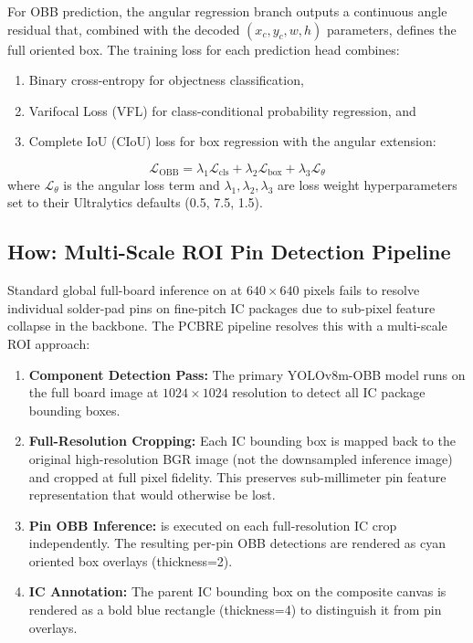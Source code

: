 \documentclass[12pt,a4paper]{report}
\begin{document}
For OBB prediction, the angular regression branch outputs a continuous angle residual that, combined with the decoded $(x_c, y_c, w, h)$ parameters, defines the full oriented box. The training loss for each prediction head combines:
\begin{enumerate}
  \item Binary cross-entropy for objectness classification,
  \item Varifocal Loss (VFL) for class-conditional probability regression, and
  \item Complete IoU (CIoU) loss for box regression with the angular extension:
\end{enumerate}
\begin{equation}
\label{eq:loss}
\mathcal{L}_{\text{OBB}} = \lambda_1 \mathcal{L}_{\text{cls}} + \lambda_2 \mathcal{L}_{\text{box}} + \lambda_3 \mathcal{L}_{\theta}
\end{equation}
where $\mathcal{L}_{\theta}$ is the angular loss term and $\lambda_1, \lambda_2, \lambda_3$ are loss weight hyperparameters set to their Ultralytics defaults (0.5, 7.5, 1.5).

\subsection{How: Multi-Scale ROI Pin Detection Pipeline}
\label{subsec:pin_pipeline}

Standard global full-board inference on  at $640 \times 640$ pixels fails to resolve individual solder-pad pins on fine-pitch IC packages due to sub-pixel feature collapse in the backbone. The PCBRE pipeline resolves this with a multi-scale ROI approach:

\begin{enumerate}
  \item \textbf{Component Detection Pass:} The primary YOLOv8m-OBB model runs on the full board image at $1024 \times 1024$ resolution to detect all IC package bounding boxes.
  \item \textbf{Full-Resolution Cropping:} Each IC bounding box is mapped back to the original high-resolution BGR image (not the downsampled inference image) and cropped at full pixel fidelity. This preserves sub-millimeter pin feature representation that would otherwise be lost.
  \item \textbf{Pin OBB Inference:}  is executed on each full-resolution IC crop independently. The resulting per-pin OBB detections are rendered as cyan oriented box overlays (thickness=2).
  \item \textbf{IC Annotation:} The parent IC bounding box on the composite canvas is rendered as a bold blue rectangle (thickness=4) to distinguish it from pin overlays.
\end{enumerate}
\end{document}
